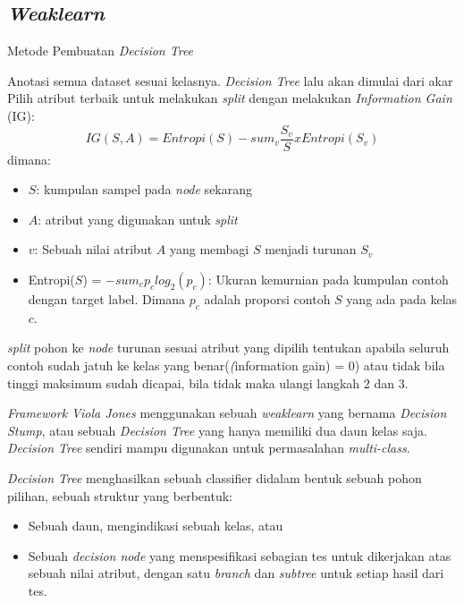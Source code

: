 \subsection{\emph{Weaklearn}}

\begin{algorithm}
  \caption{Metode Pembuatan \textit{Decision Tree}}
  \begin{algorithmic} [1]
    \State Anotasi semua dataset sesuai kelasnya. \textit{Decision Tree} lalu 
    akan dimulai dari akar
    \State Pilih atribut terbaik untuk melakukan \textit{split} dengan melakukan 
    \emph{Information Gain} (IG):
    \begin{equation}
      IG(S, A) = Entropi(S) - sum_v \frac{S_v}{S} x Entropi(S_v)
    \end{equation} 
    dimana:
    \begin{itemize}
      \item $S$: kumpulan sampel pada \emph{node} sekarang
      \item $A$: atribut yang digunakan untuk \textit{split}
      \item $v$: Sebuah nilai atribut $A$ yang membagi $S$ menjadi turunan $S_v$
      \item Entropi($S$) = $-sum_c p_c log_2(p_c)$: Ukuran kemurnian pada kumpulan 
      contoh dengan target label. Dimana $p_c$ adalah proporsi contoh $S$ yang ada 
      pada kelas $c$. 
    \end{itemize}
    \State \textit{split} pohon ke \textit{node} turunan sesuai atribut yang dipilih 
    \State tentukan apabila seluruh contoh sudah jatuh ke kelas yang benar(\textit(information gain) = 0) 
    atau tidak bila tinggi maksimum sudah dicapai, bila tidak 
    maka ulangi langkah 2 dan 3.
  \end{algorithmic}
\end{algorithm}

\emph{Framework Viola Jones} menggunakan sebuah \emph{weaklearn} yang bernama 
\emph{Decision Stump}, atau sebuah \emph{Decision Tree} yang hanya memiliki 
dua daun kelas saja. \emph{Decision Tree} sendiri mampu digunakan untuk 
permasalahan \emph{multi-class}.

\emph{Decision Tree} menghasilkan sebuah classifier didalam bentuk sebuah pohon 
pilihan, sebuah struktur yang berbentuk:
\begin{itemize}
  \item Sebuah daun, mengindikasi sebuah kelas, atau
  \item Sebuah \emph{decision node} yang menspesifikasi 
  sebagian tes untuk dikerjakan atas sebuah nilai 
  atribut, dengan satu \emph{branch} dan \emph{subtree} untuk 
  setiap hasil dari tes.
\end{itemize}

